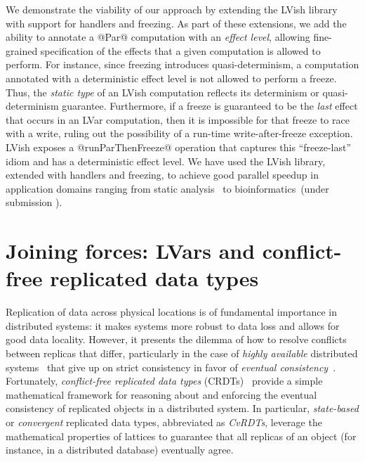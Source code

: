 \documentclass{article}
\begin{document}
We demonstrate the viability of our approach by extending the LVish
library with support for handlers and freezing.  As part of these
extensions, we add the ability to annotate a @Par@ computation with an
\emph{effect level}, allowing fine-grained specification of the
effects that a given computation is allowed to perform.  For instance,
since freezing introduces quasi-determinism, a computation annotated
with a deterministic effect level is not allowed to perform a freeze.
Thus, the \emph{static type} of an LVish computation reflects its
determinism or quasi-determinism guarantee.  Furthermore, if a freeze
is guaranteed to be the \emph{last} effect that occurs in an LVar
computation, then it is impossible for that freeze to race with a
write, ruling out the possibility of a run-time write-after-freeze
exception.  LVish exposes a @runParThenFreeze@ operation that captures
this ``freeze-last'' idiom and has a deterministic effect level.  We
have used the LVish library, extended with handlers and freezing, to
achieve good parallel speedup in application domains ranging from
static analysis~\cite{Freeze-paper} to bioinformatics~(under
submission \cite{effectzoo-draft}).

\section{Joining forces: LVars and conflict-free replicated data types}\label{crdts}

Replication of data across physical locations is of fundamental
importance in distributed systems: it makes systems more robust to
data loss and allows for good data locality.  However, it presents the
dilemma of how to resolve conflicts between replicas that differ,
particularly in the case of \emph{highly available} distributed
systems~\cite{dynamo} that give up on strict consistency in favor of
\emph{eventual consistency}~\cite{vogels-ec}.  Fortunately,
\emph{conflict-free replicated data types} (CRDTs)~\cite{crdts,
  crdts-tr} provide a simple mathematical framework for reasoning
about and enforcing the eventual consistency of replicated objects in
a distributed system.  In particular, \emph{state-based} or
\emph{convergent} replicated data types, abbreviated as \emph{CvRDTs},
leverage the mathematical properties of lattices to guarantee that all
replicas of an object (for instance, in a distributed database)
eventually agree.
\end{document}
